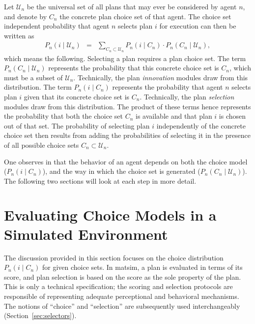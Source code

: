 Let $\mathcal{U}_n$ be the universal set of all plans that may ever be considered
by agent $n$, and denote by $C_{n}$ the concrete plan choice set
of that agent. The choice set independent probability that agent $n$
selects plan $i$ for execution can then be written as
\begin{eqnarray}
P_{n}(i\mid \mathcal{U}_n) & = & \sum_{C_{n}\subset \mathcal{U}_n}P_{n}(i\mid C_{n})\cdot P_{n}(C_{n}\mid \mathcal{U}_n),
\label{eq:unconditional-choice-proba}
\end{eqnarray}
which means the following. Selecting a plan requires a plan choice
set. The term $P_{n}(C_{n}\mid \mathcal{U}_n)$ represents the probability that
this concrete choice set is $C_{n}$, which must be a subset of $\mathcal{U}_n$.
Technically, the plan \emph{innovation} modules draw from this distribution.
The term $P_{n}(i\mid C_{n})$ represents the probability that agent
$n$ selects plan $i$ given that its concrete choice set is $C_{n}$.
Technically, the plan \emph{selection} modules draw from this distribution.
The product of these terms hence represents the probability that both
the choice set $C_{n}$ is available and that plan $i$ is chosen out
of that set. The probability of selecting plan $i$ independently
of the concrete choice set then results from adding the probabilities
of selecting it in the presence of all possible choice sets $C_{n}\subset \mathcal{U}_n$.

One observes in  that the behavior of an agent depends on both the choice model ($P_{n}(i\mid C_{n})$), and the way in which the choice set is generated ($P_{n}(C_{n}\mid \mathcal{U}_n)$). The following two sections will look at each step in more detail.

\section{\label{sec:Evaluating-choice-models}Evaluating Choice Models in
a Simulated Environment}

The discussion provided in this section focuses on the choice distribution
$P_{n}(i\mid C_{n})$ for given choice sets. In \gls{matsim}, a plan is
evaluated in terms of its score, and plan selection is based on the
score as the sole property of the plan. This is only a technical specification;
the scoring and selection protocols are responsible of representing
adequate perceptional and behavioral mechanisms. The notions of {}``choice''
and {}``selection'' are subsequently used interchangeably (\cf Section~\ref{sec:selectors}).

